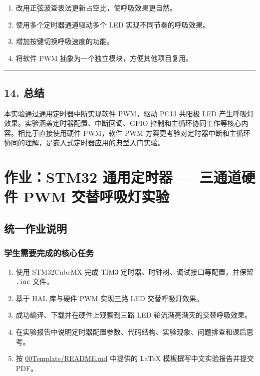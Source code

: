 \documentclass[
  chinese,
  UTF8,
  oneside,
  openany]{ctexbook}
\providecommand{\tightlist}{%
  \setlength{\itemsep}{0pt}\setlength{\parskip}{0pt}}
\begin{document}
\begin{enumerate}
\def\labelenumi{\arabic{enumi}.}
\tightlist
\item
  改用正弦波查表法更新占空比，使呼吸效果更自然。
\item
  使用多个定时器通道驱动多个 LED 实现不同节奏的呼吸效果。
\item
  增加按键切换呼吸速度的功能。
\item
  将软件 PWM 抽象为一个独立模块，方便其他项目复用。
\end{enumerate}

\begin{center}\rule{0.5\linewidth}{0.5pt}\end{center}

\section{14. 总结}\label{ux603bux7ed3-3}

本实验通过通用定时器中断实现软件 PWM，驱动 PC13 共阳极 LED
产生呼吸灯效果。实验涵盖定时器配置、中断回调、GPIO
控制和主循环协同工作等核心内容。相比于直接使用硬件 PWM，软件 PWM
方案更考验对定时器中断和主循环协同的理解，是嵌入式定时器应用的典型入门实验。

\chapter{作业：STM32 通用定时器 --- 三通道硬件 PWM
交替呼吸灯实验}\label{ux4f5cux4e1astm32-ux901aux7528ux5b9aux65f6ux5668-ux4e09ux901aux9053ux786cux4ef6-pwm-ux4ea4ux66ffux547cux5438ux706fux5b9eux9a8c}

\section{统一作业说明}\label{ux7edfux4e00ux4f5cux4e1aux8bf4ux660e-7}

\subsection{学生需要完成的核心任务}\label{ux5b66ux751fux9700ux8981ux5b8cux6210ux7684ux6838ux5fc3ux4efbux52a1-7}

\begin{enumerate}
\def\labelenumi{\arabic{enumi}.}
\tightlist
\item
  使用 STM32CubeMX 完成 TIM3 定时器、时钟树、调试接口等配置，并保留
  \texttt{.ioc} 文件。
\item
  基于 HAL 库与硬件 PWM 实现三路 LED 交替呼吸灯效果。
\item
  成功编译、下载并在硬件上观察到三路 LED 轮流渐亮渐灭的交替呼吸效果。
\item
  在实验报告中说明定时器配置参数、代码结构、实验现象、问题排查和课后思考。
\item
  按 \href{../00Template/README.md}{00Template/README.md} 中提供的 LaTeX
  模板撰写中文实验报告并提交 PDF。
\end{enumerate}
\end{document}
